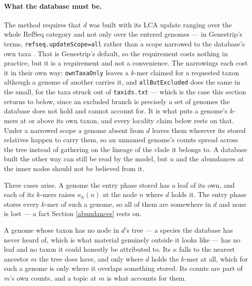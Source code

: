 \documentclass[pdflatex,sn-vancouver-num]{sn-jnl}
\begin{document}
    \paragraph{What the database must be.} The method requires that $d$ was built with its LCA update
    ranging over the whole RefSeq category and not only over the entered genomes --- in Genestrip's
    terms, \texttt{refseq.updateScope=all} rather than a scope narrowed to the database's own taxa
    \citep{genestrip-pub}. That is Genestrip's default, so the requirement costs nothing in practice,
    but it is a requirement and not a convenience. The narrowings each cost it in their own way:
    \texttt{ownTaxaOnly} leaves a $k$-mer claimed for a requested taxon although a genome of another
    carries it, and \texttt{allButExcluded} does the same in the small, for the taxa struck out of
    \texttt{taxids.txt} --- which is the case this section returns to below, since an excluded
    branch is precisely a set of genomes the database does not hold and cannot account for. It is
    what puts a genome's $k$-mers at or above its own taxon, and every locality claim below rests on
    that. Under a narrowed scope a genome absent from $d$ leaves them wherever its stored relatives
    happen to carry them, so an unnamed genome's counts spread across the tree instead of gathering
    on the lineage of the clade it belongs to. A database built the other way can still be read by
    the model, but $u$ and the abundances at the inner nodes should not be believed from it.

    Three cases arise. A genome the entry phase stored has a leaf of its own, and each of
    its $k$-mers raises $\kappa_h(n)$ at the node $n$ where $d$ holds it. The
    entry phase stores every $k$-mer of such a genome, so all of them are somewhere in $d$ and none is
    lost --- a fact Section \ref{abundances} rests on.

    A genome whose taxon has no node in $d$'s tree --- a species the database has never heard of,
    which is what material genuinely outside it looks like --- has no leaf and no taxon it could
    honestly be attributed to. Its $\kappa$ falls to the nearest ancestor $m$ the tree does
    have, and only where $d$ holds the $k$-mer at all, which for such a genome is only where it
    overlaps something stored. Its counts are part of $m$'s own counts, and a topic at $m$ is what
    accounts for them.
\end{document}
